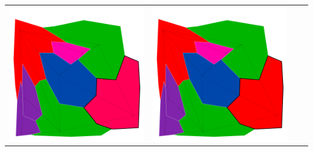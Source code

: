 \documentclass[10pt,a4paper]{article}
\begin{document}
\begin{tabular}{c c c c }
	\includegraphics[scale=.10]{../results/backtracking_mac/map_build/bt_mac_I00009.pdf}&
	\includegraphics[scale=.10]{../results/backtracking_mac/map_build/bt_mac_I00010.pdf}&

\end{tabular}
\end{document}
